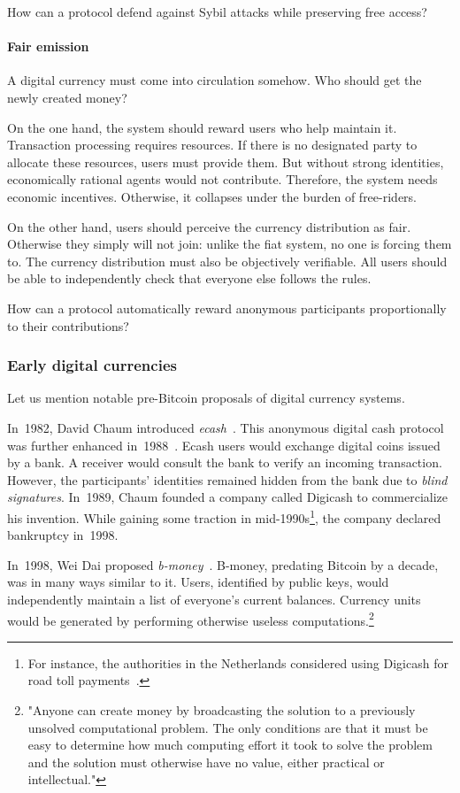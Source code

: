 How can a protocol defend against Sybil attacks while preserving free access?


\paragraph{Fair emission}

A digital currency must come into circulation somehow.
Who should get the newly created money?

On the one hand, the system should reward users who help maintain it.
Transaction processing requires resources.
If there is no designated party to allocate these resources, users must provide them.
But without strong identities, economically rational agents would not contribute.
Therefore, the system needs economic incentives.
Otherwise, it collapses under the burden of free-riders.

On the other hand, users should perceive the currency distribution as fair.
Otherwise they simply will not join: unlike the fiat system, no one is forcing them to.
The currency distribution must also be objectively verifiable.
All users should be able to independently check that everyone else follows the rules.

How can a protocol automatically reward anonymous participants proportionally to their contributions?


\subsubsection*{Early digital currencies}

Let us mention notable pre-Bitcoin proposals of digital currency systems.

In~1982, David Chaum introduced \textit{ecash}~\cite{Chaum1982}.
This anonymous digital cash protocol was further enhanced in~1988~\cite{Chaum1988}.
Ecash users would exchange digital coins issued by a bank.
A receiver would consult the bank to verify an incoming transaction.
However, the participants' identities remained hidden from the bank due to \textit{blind signatures}.
In~1989, Chaum founded a company called Digicash to commercialize his invention.
While gaining some traction in mid-1990s\footnote{For instance, the authorities in the Netherlands considered using Digicash for road toll payments~\cite{Chaum2019}.}, the company declared bankruptcy in~1998.

In~1998, Wei Dai proposed \textit{b-money}~\cite{Dai1998}.
B-money, predating Bitcoin by a decade, was in many ways similar to it.
Users, identified by public keys, would independently maintain a list of everyone's current balances.
Currency units would be generated by performing otherwise useless computations.\footnote{"Anyone can create money by broadcasting the solution to a previously unsolved computational problem. The only conditions are that it must be easy to determine how much computing effort it took to solve the problem and the solution must otherwise have no value, either practical or intellectual."}

